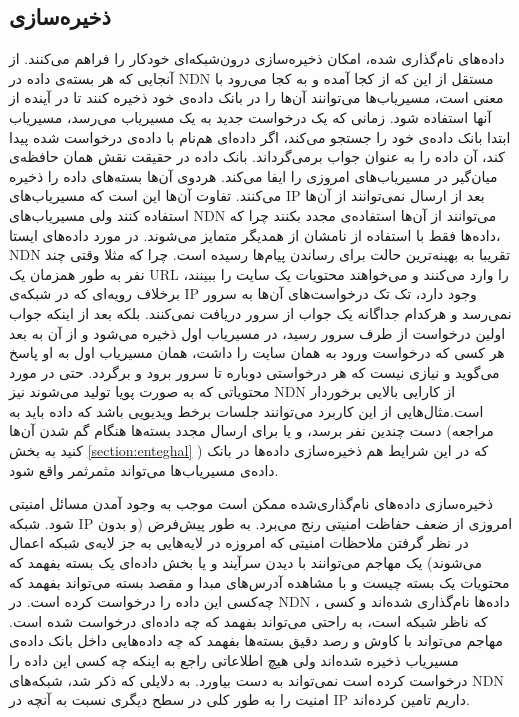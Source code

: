 \subsection{ذخیره‌سازی}
داده‌های نام‌گذاری شده، امکان ذخیره‌سازی درون‌شبکه‌ای خودکار را فراهم‌ می‌کنند. از آنجایی که هر بسته‌ی داده در NDN مستقل از این که از کجا آمده و به کجا می‌رود با معنی است، مسیریاب‌ها می‌توانند آن‌ها را در بانک داده‌ی خود ذخیره کنند تا در آینده از آنها استفاده شود. زمانی که یک درخواست جدید به یک مسیریاب می‌رسد، مسیریاب ابتدا بانک داده‌ی خود را جستجو می‌کند، اگر داده‌ای هم‌نام با داده‌ی درخواست شده پیدا کند، آن داده را به عنوان جواب برمی‌گرداند. بانک داده در حقیقت نقش همان حافظه‌‌ی میان‌گیر در مسیریاب‌های امروزی را ایفا می‌کند. هردوی آن‌ها بسته‌‌های داده را ذخیره‌ می‌کنند. تفاوت آن‌ها این است که مسیریاب‌‌های IP بعد از ارسال نمی‌توانند از آن‌ها استفاده کنند ولی مسیریاب‌های NDN  می‌توانند از آن‌ها استفاده‌ی مجدد بکنند چرا که داده‌‌ها فقط با استفاده از نامشان از همدیگر متمایز می‌شوند. در مورد داده‌های ایستا، NDN تقریبا به بهینه‌ترین حالت برای رساندن پیام‌ها رسیده است. چرا که مثلا وقتی چند نفر به طور همزمان یک URL را وارد می‌کنند و می‌خواهند محتویات یک سایت را ببینند، برخلاف رویه‌ای که در شبکه‌ی IP وجود دارد، تک تک درخواست‌های آن‌ها به سرور نمی‌رسد و هرکدام جداگانه یک جواب از سرور دریافت نمی‌کنند. بلکه بعد از اینکه جواب اولین درخواست از طرف سرور رسید، در مسیریاب اول ذخیره می‌شود و از آن به بعد هر کسی که درخواست ورود به همان سایت را داشت، همان مسیریاب اول به او پاسخ می‌گوید و نیازی نیست که هر درخواستی دوباره تا سرور برود و برگردد. حتی در مورد محتویاتی که به صورت پویا تولید می‌شوند نیز NDN از کارایی بالایی برخوردار است.مثال‌هایی از این کاربرد می‌توانند جلسات برخط ویدیویی باشد که داده باید به دست چندین نفر برسد، و یا برای ارسال مجدد بسته‌ها هنگام گم شدن آن‌ها (مراجعه کنید به بخش 
\ref{section:enteghal}
) که در این شرایط هم ذخیره‌سازی داده‌ها در بانک داده‌ی مسیریاب‌ها می‌تواند مثمرثمر واقع شود. 

ذخیره‌سازی داده‌های نام‌گذاری‌شده ممکن است موجب به وجود آمدن مسائل امنیتی شود. شبکه IP امروزی از ضعف حفاظت امنیتی رنج می‌برد. به طور پیش‌فرض (و بدون در نظر گرفتن ملاحظات امنیتی که امروزه در لایه‌هایی به جز لایه‌ی شبکه اعمال می‌شوند) یک مهاجم می‌توانند با دیدن سرآیند و یا بخش داده‌ای یک بسته بفهمد که محتویات یک بسته چیست و با مشاهده آدرس‌های مبدا و مقصد بسته می‌تواند بفهمد که چه‌کسی این داده را درخواست کرده است. در NDN ، داده‌ها نام‌گذاری شده‌اند و کسی که  ناظر شبکه است، به راحتی می‌تواند بفهمد که چه داده‌ای درخواست شده است. مهاجم می‌تواند با کاوش و رصد دقیق بسته‌ها بفهمد که چه داده‌هایی داخل بانک داده‌ی مسیریاب ذخیره شده‌اند ولی هیچ اطلاعاتی راجع به اینکه چه کسی این داده را درخواست کرده است نمی‌تواند به دست بیاورد. به دلایلی که ذکر شد، شبکه‌های NDN امنیت را به طور کلی در سطح دیگری نسبت به آنچه در IP  داریم تامین کرده‌اند. 


